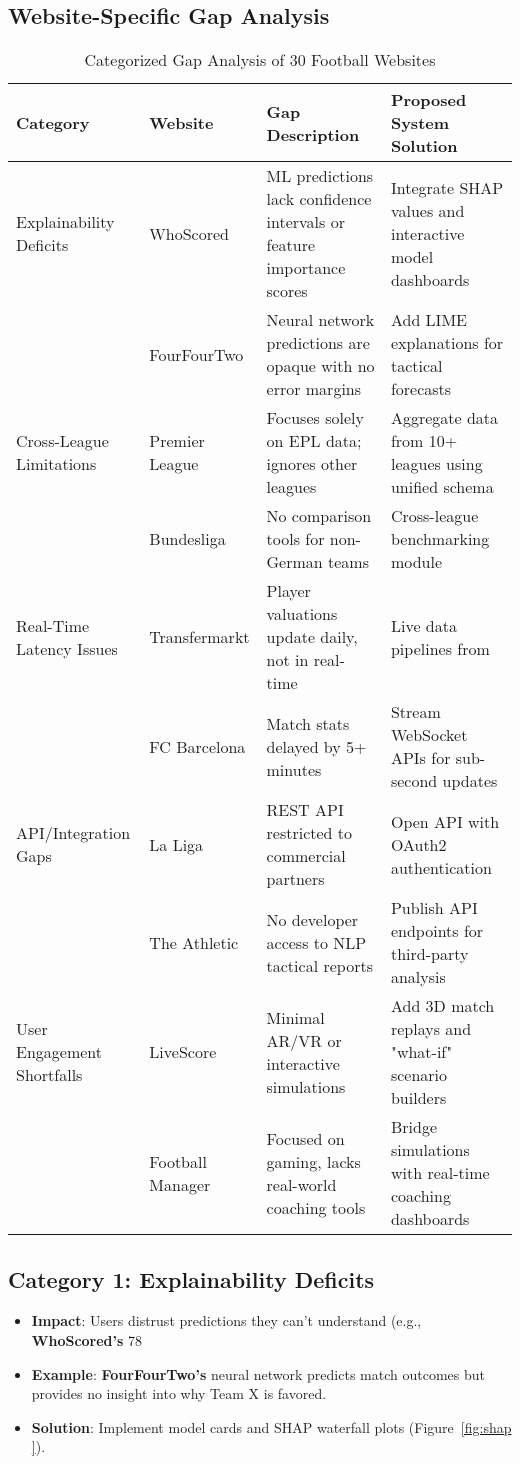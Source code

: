 \subsection{Website-Specific Gap Analysis}
\begin{table}[h!]
\centering
\caption{Categorized Gap Analysis of 30 Football Websites}
\label{tab:gap-categories}
\scriptsize
\begin{tabularx}{\textwidth}{|l|l|X|X|}
\hline
\textbf{Category} & \textbf{Website} & \textbf{Gap Description} & \textbf{Proposed System Solution} \\
\hline
Explainability Deficits & WhoScored & ML predictions lack confidence intervals or feature importance scores & Integrate SHAP values and interactive model dashboards \\
\cline{2-4}
& FourFourTwo & Neural network predictions are opaque with no error margins & Add LIME explanations for tactical forecasts \\
\hline
Cross-League Limitations & Premier League & Focuses solely on EPL data; ignores other leagues & Aggregate data from 10+ leagues using unified schema \\
\cline{2-4}
& Bundesliga & No comparison tools for non-German teams & Cross-league benchmarking module \\
\hline
Real-Time Latency Issues & Transfermarkt & Player valuations update daily, not in real-time & Live data pipelines from \cite{flashscore} \\
\cline{2-4}
& FC Barcelona & Match stats delayed by 5+ minutes & Stream WebSocket APIs for sub-second updates \\
\hline
API/Integration Gaps & La Liga & REST API restricted to commercial partners & Open API with OAuth2 authentication \\
\cline{2-4}
& The Athletic & No developer access to NLP tactical reports & Publish API endpoints for third-party analysis \\
\hline
User Engagement Shortfalls & LiveScore & Minimal AR/VR or interactive simulations & Add 3D match replays and "what-if" scenario builders \\
\cline{2-4}
& Football Manager & Focused on gaming, lacks real-world coaching tools & Bridge simulations with real-time coaching dashboards \\
\hline
\end{tabularx}
\end{table}

\subsection{Category 1: Explainability Deficits}
\begin{itemize}
\item \textbf{Impact}: Users distrust predictions they can’t understand (e.g., \textbf{WhoScored’s} 78%
\item \textbf{Example}: \textbf{FourFourTwo’s} neural network predicts match outcomes but provides no insight into why Team X is favored.
\item \textbf{Solution}: Implement model cards and SHAP waterfall plots (Figure~\ref{fig:shap }).
\end{itemize}

